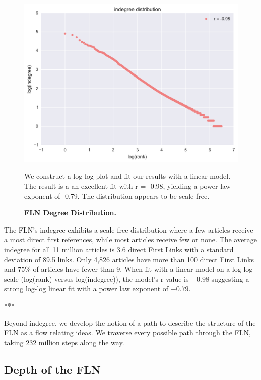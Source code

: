 \documentclass[pre,twocolumn,twoside,superscriptaddress,floatfix, aps, 10pt]{revtex4-1}
\begin{document}
\begin{figure}[tp!]
  \centering	
  \includegraphics[width=\columnwidth]{graphics/ndegree_loglog.png}
  \caption{
    \textbf{FLN Degree Distribution.}
  }
  We construct a log-log plot and fit our results with a linear model. The result is a 
  an excellent fit with r = -0.98, yielding a power law exponent of -0.79. 
  The distribution appears to be scale free.
  \label{fig:degree distribution}
\end{figure}

The FLN's indegree exhibits a scale-free distribution where a few articles 
receive a most direct first references, while most articles receive few or none.
The average indegree for all 11 million articles is 3.6 direct First Links with a standard deviation of 89.5 links.
Only 4,826 articles have more than 100 direct First Links and $75\%$ of articles
have fewer than 9. 
When fit with a linear model on a log-log scale (log(rank) versus log(indegree)), 
the model's r value is $-0.98$ suggesting a strong log-log linear fit 
with a power law exponent of $-0.79$. 

\centerline{***}

Beyond indegree, we develop the notion of a path to describe the structure of the FLN as a 
flow relating ideas. We traverse every possible path through the FLN, taking 
$232$ million steps along the way.


\subsection{Depth of the FLN}
\end{document}
